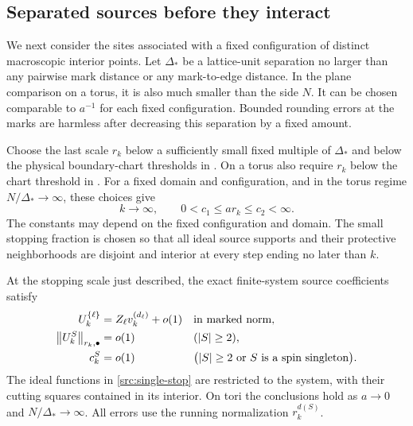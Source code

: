 \subsection{Separated sources before they interact}

We next consider the sites associated with a fixed configuration of
distinct macroscopic interior points. Let $\Delta_*$ be a lattice-unit
separation no larger than any pairwise mark distance or any mark-to-edge
distance. In the plane comparison on a torus, it is also much smaller
than the side $N$. It can be chosen comparable to $a^{-1}$ for each fixed
configuration. Bounded rounding errors at the marks are harmless after
decreasing this separation by a fixed amount.

Choose the last scale $r_k$ below a sufficiently small fixed multiple of
$\Delta_*$ and below the physical boundary-chart thresholds in
. On a torus also require $r_k$ below the chart
threshold in . For a fixed domain and configuration,
and in the torus regime $N/\Delta_*\to\infty$, these choices give
\begin{equation}
 k\longrightarrow\infty,
 \qquad 0<c_1\leq a r_k\leq c_2<\infty.
 \label{src:stop-scale}
\end{equation}
The constants may depend on the fixed configuration and domain. The
small stopping fraction is chosen so that all ideal source supports and
their protective neighborhoods are disjoint and interior at every step
ending no later than $k$.

\begin{proposition}
\label{src:separated}
At the stopping scale just described, the exact finite-system source
coefficients satisfy
\begin{align}
 U_k^{\{\ell\}}
   &=Z_\ell v_k^{(d_\ell)}+o(1)
       &&\text{in marked norm}, \label{src:single-stop}\\
 \left\|U_k^S\right\|_{r_k,\bullet}&=o(1)
       &&(|S|\geq2), \label{src:multiple-stop}\\
 c_k^S&=o(1)
       &&\bigl(|S|\geq2\text{ or }S
                         \text{ is a spin singleton}\bigr).
       \label{src:scalar-stop}
\end{align}
The ideal functions in \eqref{src:single-stop} are restricted to the
system, with their cutting squares contained in its interior. On tori
the conclusions hold as $a\to0$ and $N/\Delta_*\to\infty$.
All errors use the running normalization $r_k^{d(S)}$.
\end{proposition}

